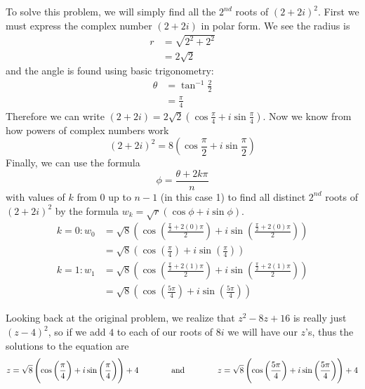 \documentclass{scrartcl}
\begin{document}
To solve this problem, we will simply find all the $2^{nd}$ roots of $(2 + 2i)^2$. First we must express the complex number $(2 + 2i)$ in polar form. We see the radius is
\begin{align*}
r &= \sqrt{2^2 + 2^2}\\
  &= 2\sqrt{2}
\end{align*}
and the angle is found using basic trigonometry:
\begin{align*}
  \theta &= \tan^{-1}{\frac{2}{2}}\\
        &= \frac{\pi}{4}
\end{align*}
Therefore we can write $(2 + 2i) = 2\sqrt{2}\left(\cos{\frac{\pi}{4}} + i\sin{\frac{\pi}{4}}\right)$. Now we know from how powers of complex numbers work
$$ (2 + 2i)^2 = 8\left(\cos{\frac{\pi}{2}} + i\sin{\frac{\pi}{2}}\right) $$
Finally, we can use the formula $$\phi = \frac{\theta + 2k\pi}{n}$$ with values of $k$ from 0 up to $n-1$ (in this case 1) to find all distinct $2^{nd}$ roots of $(2 + 2i)^2$ by the formula $w_k = \sqrt{r}\left(\cos{\phi}+i\sin{\phi}\right)$.
\begin{align*}
  k=0 : w_0 &= \sqrt{8}\left(\cos\left(\frac{\frac{\pi}{2}+2(0)\pi}{2}\right)+i\sin\left(\frac{\frac{\pi}{2}+2(0)\pi}{2}\right)\right)\\
            &= \sqrt{8}\left(\cos\left(\frac{\pi}{4}\right)+i\sin\left(\frac{\pi}{4}\right)\right)\\
  k=1 : w_1 &= \sqrt{8}\left(\cos\left(\frac{\frac{\pi}{2}+2(1)\pi}{2}\right)+i\sin\left(\frac{\frac{\pi}{2}+2(1)\pi}{2}\right)\right)\\
            &= \sqrt{8}\left(\cos\left(\frac{5\pi}{4}\right)+i\sin\left(\frac{5\pi}{4}\right)\right)
\end{align*}

Looking back at the original problem, we realize that $z^2 -8z + 16$ is really just $(z - 4)^2$, so if we add $4$ to each of our roots of $8i$ we will have our $z$'s, thus the solutions to the equation are
$$ z=\sqrt{8}\left(\cos\left(\frac{\pi}{4}\right)+i\sin\left(\frac{\pi}{4}\right)\right) + 4 \text{\hspace{0.5 in} and \hspace{0.5 in}} z=\sqrt{8}\left(\cos\left(\frac{5\pi}{4}\right)+i\sin\left(\frac{5\pi}{4}\right)\right) + 4 $$
\end{document}
